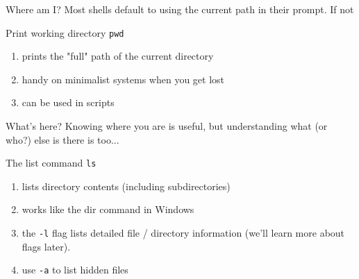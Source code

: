 \documentclass[11pt]{beamer}
\newcommand{\colbf}[1]{\textcolor{mLightBrown!77!black}{#1}}%
\begin{document}
\begin{frame}[fragile]{Where am I?}
  Most shells default to using the current path in their prompt.  If not

  \begin{block}{\colbf{P}rint \colbf{w}orking \colbf{d}irectory}
    \texttt{pwd}
    \begin{enumerate}[\--]
      \item prints the "full" path of the current directory
      \item handy on minimalist systems when you get lost
      \item can be used in scripts
    \end{enumerate}
    \vspace*{1em}
  \end{block}
\end{frame}

\begin{frame}[fragile]{What's here?}
  Knowing where you are is useful, but understanding what (or who?) else is there is too...

  \begin{block}{The \colbf{l}i\colbf{s}t command}
    \texttt{ls}
    \begin{enumerate}[\--]
      \item lists directory contents (including subdirectories)
      \item works like the dir command in Windows
      \item the \texttt{-l} flag lists detailed file / directory information (we'll learn more about flags later).
      \item use \texttt{-a} to list hidden files
    \end{enumerate}
    \vspace*{1em}
  \end{block}
\end{frame}
\end{document}
